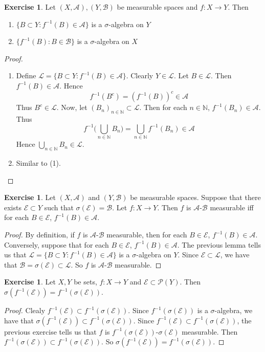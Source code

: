 \documentclass[12pt]{amsart}
\theoremstyle{definition}
\newtheorem{ex}[definition]{Exercise}
\newcommand{\sig}{\sigma}
\newcommand{\N}{\mathbb{N}}
\newcommand{\MA}{\mathcal{A}}
\newcommand{\MB}{\mathcal{B}}
\newcommand{\ML}{\mathcal{L}}
\newcommand{\MP}{\mathcal{P}}
\newcommand{\ME}{\mathcal{E}}
\newcommand{\lex}[1]{\label{ex:#1}}
\begin{document}
	\begin{ex} \lex{00000} 
		Let $(X,\MA), (Y,\MB)$ be measurable spaces and $f: X \rightarrow Y$. Then 
		\begin{enumerate}
			\item $\{B \subset Y: f^{-1}(B) \in \MA\}$ is a $\sig$-algebra on $Y$
			\item $\{f^{-1}(B): B \in \MB\}$ is a $\sig$-algebra on $X$
		\end{enumerate}
	\end{ex}
	
	\begin{proof}\
		\begin{enumerate}
			\item Define $\ML = \{B \subset Y: f^{-1}(B) \in \MA\}$.  Clearly $Y \in \ML$. Let $B \in \ML$. Then $f^{-1}(B) \in \MA$. Hence $$f^{-1}(B^c) = (f^{-1}(B))^c \in \MA$$ Thus $B^c \in \ML$. Now, let $(B_n)_{n \in \N} \subset \ML$. Then for each $n \in \N$, $f^{-1}(B_n) \in \MA$. Thus $$f^{-1}\bigg(\bigcup_{n \in \N} B_n \bigg) = \bigcup_{n \in \N} f^{-1}(B_n) \in \MA$$ Hence $\bigcup\limits_{n \in \N} B_n \in \ML$.
			\item Similar to (1).
		\end{enumerate}
	\end{proof}
	
	\begin{ex} \lex{00000} 
		Let $(X,\MA)$ and $(Y, \MB)$ be measurable spaces. Suppose that there exists $\ME \subset Y$ such that $\sig(\ME) = \MB$. Let $f:X \rightarrow Y$. Then $f$ is $\MA$-$\MB$ measurable iff for each $B \in \ME$, $f^{-1}(B) \in \MA$.
	\end{ex}
	
	\begin{proof}
		By definition, if $f$ is $\MA$-$\MB$ measurable, then for each $B \in \ME$, $f^{-1}(B) \in \MA$. Conversely, suppose that for each $B \in \ME$, $f^{-1}(B) \in \MA$. The previous lemma tells us that $\ML = \{B \subset Y: f^{-1}(B) \in \MA\}$ is a $\sig$-algebra on $Y$. Since $\ME \subset \ML$, we have that $\MB = \sig(\ME) \subset \ML$. So $f$ is $\MA$-$\MB$ measurable.
	\end{proof}
	
	\begin{ex} \lex{00000} 
		Let $X,Y$ be sets, $f:X \rightarrow Y$ and $\ME \subset \MP(Y)$. Then $\sig(f^{-1}(\ME)) = f^{-1}(\sig(\ME))$. 
	\end{ex}
	
	\begin{proof}
		Clealy $f^{-1}(\ME) \subset f^{-1}(\sig(\ME))$. Since $f^{-1}(\sig(\ME))$ is a $\sig$-algebra, we have that $\sig(f^{-1}(\ME)) \subset f^{-1}(\sig(\ME))$. Since $f^{-1}(\ME) \subset f^{-1}(\sig(\ME))$, the previous exercise tells us that $f$ is $f^{-1}(\sig(\ME))$-$\sig(\ME)$ measurable. Then $f^{-1}(\sig(\ME)) \subset f^{-1}(\sig(\ME))$. So $\sig(f^{-1}(\ME)) = f^{-1}(\sig(\ME))$.  
	\end{proof}
	
\end{document}

